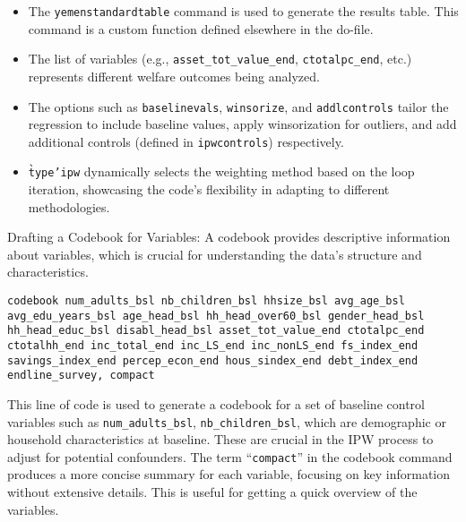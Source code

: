 \documentclass{article}
\begin{document}
\begin{itemize}
    \item The \texttt{yemenstandardtable} command is used to generate the results table. This command is a custom function defined elsewhere in the do-file.
    \item The list of variables (e.g., \texttt{asset\_tot\_value\_end}, \texttt{ctotalpc\_end}, etc.) represents different welfare outcomes being analyzed.
    \item The options such as \texttt{baselinevals}, \texttt{winsorize}, and \texttt{addlcontrols} tailor the regression to include baseline values, apply winsorization for outliers, and add additional controls (defined in \texttt{ipwcontrols}) respectively.
    \item \texttt{\`type'ipw} dynamically selects the weighting method based on the loop iteration, showcasing the code's flexibility in adapting to different methodologies.
\end{itemize}


\vspace{0.2cm} Drafting a Codebook for Variables: A codebook provides descriptive information about variables, which is crucial for understanding the data's structure and characteristics.


\begin{mdframed}
\begin{verbatim}
codebook num_adults_bsl nb_children_bsl hhsize_bsl avg_age_bsl 
avg_edu_years_bsl age_head_bsl hh_head_over60_bsl gender_head_bsl 
hh_head_educ_bsl disabl_head_bsl asset_tot_value_end ctotalpc_end 
ctotalhh_end inc_total_end inc_LS_end inc_nonLS_end fs_index_end 
savings_index_end percep_econ_end hous_sindex_end debt_index_end 
endline_survey, compact
\end{verbatim}
\end{mdframed}


\vspace{0.3cm}
This line of code is used to generate a codebook for a set of baseline control variables such as \texttt{num\_adults\_bsl}, \texttt{nb\_children\_bsl}, which are demographic or household characteristics at baseline. These are crucial in the IPW process to adjust for potential confounders.
\newline
The term “\texttt{compact}” in the codebook command produces a more concise summary for each variable, focusing on key information without extensive details. This is useful for getting a quick overview of the variables.
\end{document}
